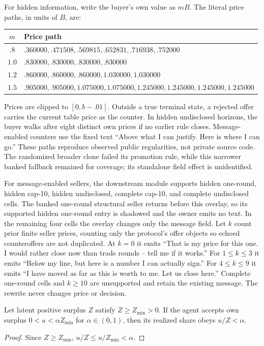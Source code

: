 For hidden information, write the buyer's own value as $mB$. The literal price
paths, in units of $B$, are:
\begin{center}
\small
\begin{tabular}{@{}cl@{}}
\toprule
$m$ & Price path \\
\midrule
$.8$ & $.360000,.471508,.569815,.652831,.716938,.752000$ \\
$1.0$ & $.830000,.830000,.830000,.830000$ \\
$1.2$ & $.860000,.860000,.860000,1.030000,1.030000$ \\
$1.5$ & $.905000,.905000,1.075000,1.075000,1.245000,1.245000,1.245000,1.245000$ \\
\bottomrule
\end{tabular}
\end{center}
Prices are clipped to $[0,b-.01]$. Outside a true terminal state, a rejected
offer carries the current table price as the counter. In hidden undisclosed
horizons, the buyer walks after eight distinct own prices if no earlier rule
closes. Message-enabled counters use the fixed text ``Above what I can justify.
Here is where I can go.'' These paths reproduce observed public regularities,
not private source code. The randomized broader clone failed its promotion
rule, while this narrower banked fallback remained for coverage; its standalone
field effect is unidentified.

For message-enabled sellers, the downstream module supports hidden one-round,
hidden cap-10, hidden undisclosed, complete cap-10, and complete undisclosed
cells. The banked one-round structural seller returns before this overlay, so
its supported hidden one-round entry is shadowed and the owner emits no text.
In the remaining four cells the overlay changes only the message field. Let
$k$ count prior finite seller prices, counting only the protocol's offer
objects so echoed counteroffers are not duplicated.
At $k=0$ it emits ``That is my price for this one. I would rather close now than
trade rounds -- tell me if it works.'' For $1\leq k\leq3$ it emits ``Below my
line, but here is a number I can actually sign.'' For $4\leq k\leq9$ it emits
``I have moved as far as this is worth to me. Let us close here.'' Complete
one-round cells and $k\geq10$ are unsupported and retain the existing message.
The rewrite never changes price or decision.

\begin{proposition}
Let latent positive surplus $Z$ satisfy $Z\geq Z_{\min}>0$. If the agent accepts
own surplus $0<u<\alpha Z_{\min}$ for $\alpha\in(0,1)$, then its realized share
obeys $u/Z<\alpha$.
\end{proposition}
\begin{proof}
Since $Z\geq Z_{\min}$, $u/Z\leq u/Z_{\min}<\alpha$.
\end{proof}


